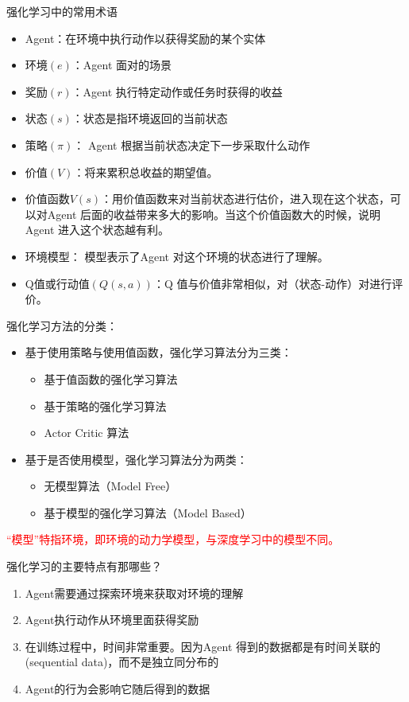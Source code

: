 \begin{note}
    强化学习中的常用术语
    \begin{itemize}
        \item Agent：在环境中执行动作以获得奖励的某个实体
        \item 环境$(e)$：Agent 面对的场景
        \item 奖励$(r)$：Agent 执行特定动作或任务时获得的收益
        \item 状态$(s)$：状态是指环境返回的当前状态
        \item 策略$(\pi)$： Agent 根据当前状态决定下一步采取什么动作
        \item 价值$(V)$：将来累积总收益的期望值。
        \item 价值函数$V (s)$：用价值函数来对当前状态进行估价，进入现在这个状态，可以对Agent 后面的收益带来多大的影响。当这个价值函数大的时候，说明Agent 进入这个状态越有利。
        \item 环境模型： 模型表示了Agent 对这个环境的状态进行了理解。
        \item Q值或行动值$(Q(s,a))$：Q 值与价值非常相似，对（状态-动作）对进行评价。
    \end{itemize}
\end{note}
\begin{note}
    强化学习方法的分类：
    \begin{itemize}
        \item 基于使用策略与使用值函数，强化学习算法分为三类：
        \begin{itemize}
            \item 基于值函数的强化学习算法
            \item 基于策略的强化学习算法
            \item Actor Critic 算法
        \end{itemize}
        \item 基于是否使用模型，强化学习算法分为两类：
        \begin{itemize}
            \item 无模型算法（Model Free）
            \item 基于模型的强化学习算法（Model Based）
        \end{itemize}
    \end{itemize}
    \textcolor{red}{“模型”特指环境，即环境的动力学模型，与深度学习中的模型不同。}
\end{note}
\begin{example}
    强化学习的主要特点有那哪些？
    \begin{enumerate}[A]
        \item \textcolor{main1}{Agent需要通过探索环境来获取对环境的理解}
        \item \textcolor{main1}{Agent执行动作从环境里面获得奖励}
        \item \textcolor{main1}{在训练过程中，时间非常重要。因为Agent 得到的数据都是有时间关联的(sequential data)，而不是独立同分布的}
        \item \textcolor{main1}{Agent的行为会影响它随后得到的数据}
    \end{enumerate}
\end{example}
